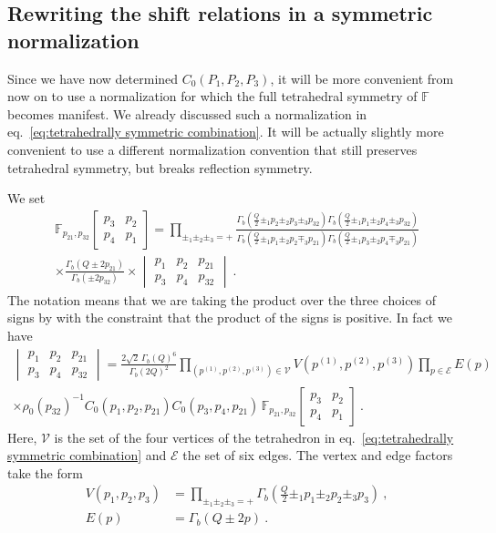\documentclass[12pt,a4paper]{article}
\newcommand{\sixjnorm}[6]{\begin{vmatrix}
#1 & #2 & #3 \\
#4 & #5 & #6
\end{vmatrix}
}
\begin{document}
\subsection{Rewriting the shift relations in a symmetric normalization}
Since we have now determined $C_0(P_1,P_2,P_3)$, it will be more convenient from now on to use a normalization for which the full tetrahedral symmetry of $\mathbb{F}$ becomes manifest. We already discussed such a normalization in eq.~\eqref{eq:tetrahedrally symmetric combination}. It will be actually slightly more convenient to use a different normalization convention that still preserves tetrahedral symmetry, but breaks reflection symmetry.

We set
\begin{multline}
    \mathbb{F}_{p_{21},p_{32}}\!\begin{bmatrix}
        p_3 & p_2 \\ p_4 & p_1
    \end{bmatrix}=\prod_{\pm_1 \pm_2 \pm_3=+} \frac{\Gamma_b(\frac{Q}{2} \pm_1 p_{2}\pm_2p_3\pm_3 p_{32})\Gamma_b(\frac{Q}{2} \pm_1 p_1 \pm_2 p_4 \pm_3 p_{32})}{\Gamma_b(\frac{Q}{2} \pm_1p_1\pm_2p_2\mp_3p_{21})\Gamma_b(\frac{Q}{2} \pm_1p_3\pm_2p_4\mp_3p_{21})}\\
    \times 
     \frac{\Gamma_b(Q\pm 2p_{21})}{\Gamma_b(\pm 2 p_{32})}\times  \sixjnorm{p_1}{p_2}{p_{21}}{p_3}{p_4}{p_{32}}\ . \label{eq:sixjnorm definition}
\end{multline}
The notation means that we are taking the product over the three choices of signs by with the constraint that the product of the signs is positive. In fact we have
\begin{multline} 
\sixjnorm{p_1}{p_2}{p_{21}}{p_3}{p_4}{p_{32}}=\frac{2\sqrt{2}\, \Gamma_b(Q)^6}{\Gamma_b(2Q)^2} \prod_{(p^{(1)},p^{(2)},p^{(3)}) \in \mathcal{V}} V(p^{(1)},p^{(2)},p^{(3)}) \prod_{p \in \mathcal{E}} E(p) \\
\times \rho_0(p_{32})^{-1} C_0(p_1,p_2,p_{21}) C_0(p_3,p_4,p_{21}) \, \mathbb{F}_{p_{21},p_{32}}\!\begin{bmatrix}
    p_3 & p_2 \\
    p_4 & p_1
\end{bmatrix}\ .
\end{multline}
Here, $\mathcal{V}$ is the set of the four vertices of the tetrahedron in eq.~\eqref{eq:tetrahedrally symmetric combination} and $\mathcal{E}$ the set of six edges. The vertex and edge factors take the form
\begin{subequations}
    \begin{align}
        V(p_1,p_2,p_3)&=\prod_{\pm_1 \pm_2 \pm_3=+} \Gamma_b(\tfrac{Q}{2} \pm_1 p_1\pm_2p_2\pm_3 p_{3})\ , \\
        E(p)&=\Gamma_b(Q \pm 2p)\ .
    \end{align}
\end{subequations}
\end{document}

